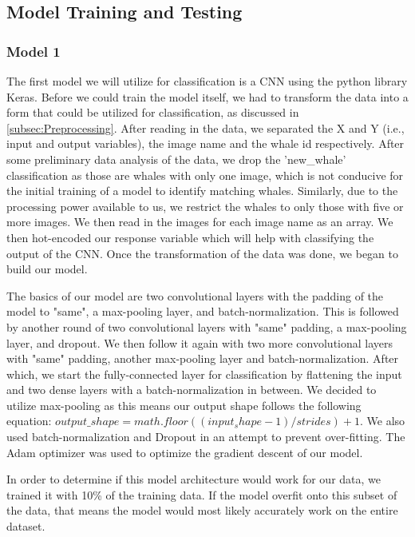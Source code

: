 \documentclass[paper=a4, fontsize=11pt]{scrartcl}
\numberwithin{equation}{section}		%
\numberwithin{table}{section}				%
\begin{document}
\subsection{Model Training and Testing}

\subsubsection{Model 1}

The first model we will utilize for classification is a CNN using the python library Keras. Before we could train the model itself, we had to transform the data into a form that could be utilized for classification, as discussed in  \autoref{subsec:Preprocessing}. After reading in the data, we separated the X and Y (i.e., input and output variables), the image name and the whale id respectively. After some preliminary data analysis of the data, we drop the 'new\_whale' classification as those are whales with only one image, which is not conducive for the initial training of a model to identify matching whales. Similarly, due to the processing power available to us, we restrict the whales to only those with five or more images. We then read in the images for each image name as an array. We then hot-encoded our response variable which will help with classifying the output of the CNN. Once the transformation of the data was done, we began to build our model.

The basics of our model are two convolutional layers with the padding of the model to "same", a max-pooling layer, and batch-normalization. This is followed by another round of two convolutional layers with "same" padding, a max-pooling layer, and dropout. We then follow it again with two more convolutional layers with "same" padding, another max-pooling layer and batch-normalization. After which, we start the fully-connected layer for classification by flattening the input and two dense layers with a batch-normalization in between. We decided to utilize max-pooling as this means our output shape follows the following equation: $output\_shape = math.floor((input_shape - 1) / strides) + 1$. We also used batch-normalization and Dropout in an attempt to prevent over-fitting. The Adam optimizer was used to optimize the gradient descent of our model.

In order to determine if this model architecture would work for our data, we trained it with 10\% of the training data. If the model overfit onto this subset of the data, that means the model would most likely accurately work on the entire dataset.
\end{document}
